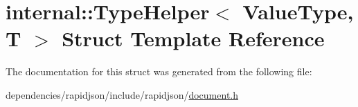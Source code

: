 \hypertarget{structinternal_1_1_type_helper}{}\section{internal\+:\+:Type\+Helper$<$ Value\+Type, T $>$ Struct Template Reference}
\label{structinternal_1_1_type_helper}


The documentation for this struct was generated from the following file\+:\begin{DoxyCompactItemize}
\item 
dependencies/rapidjson/include/rapidjson/\hyperlink{document_8h}{document.\+h}\end{DoxyCompactItemize}
